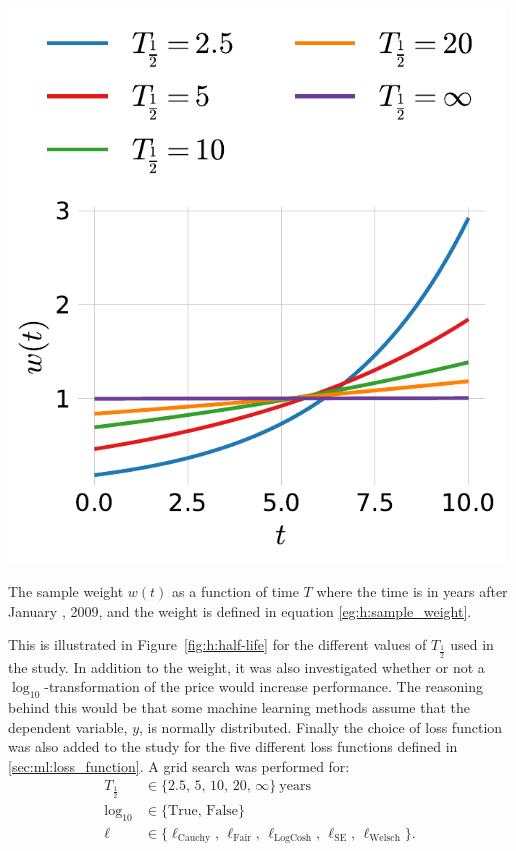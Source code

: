 \begin{marginfigure}
  \includegraphics[width=0.99\textwidth]{figures/housing/Villa_v18_cut_all_Ncols_all_half_life_weights.pdf}
  \caption[XXX ]
    {The sample weight $w(t)$ as a function of time $T$ where the time is in years after January , 2009, and the weight is defined in equation 
    \eqref{eg:h:sample_weight}. 
    }
  \label{fig:h:half-life}
\end{marginfigure}

This is illustrated in Figure~\ref{fig:h:half-life} for the different values of $T_{\frac{1}{2}}$ used in the study.  In addition to the weight, it was also investigated whether or not a $\log_{10}$-transformation of the price would increase performance. The reasoning behind this would be that some machine learning methods assume that the dependent variable, $y$, is normally distributed. Finally the choice of loss function was also added to the study for the five different loss functions defined in \autoref{sec:ml:loss_function}. A grid search was performed for:
\begin{equation}
  \begin{split}
    T_{\frac{1}{2}} &\in \{2.5,\, 5,\, 10,\, 20,\, \infty \}~\mathrm{ years} \\
    \log_{10} &\in \{\mathrm{True},\, \mathrm{False} \} \\
    \ell &\in \{ \ell_\mathrm{Cauchy},\, \ell_\mathrm{Fair},\, \ell_\mathrm{LogCosh},\, \ell_\mathrm{SE},\, \ell_\mathrm{Welsch}\}.
  \end{split}
\end{equation}

